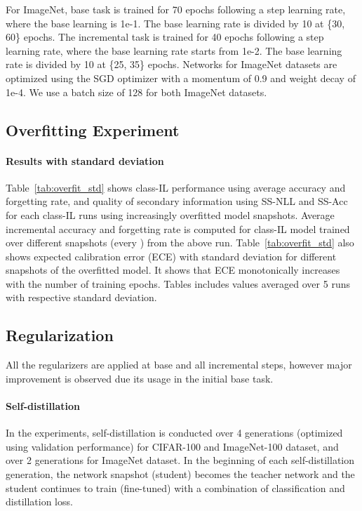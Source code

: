 \documentclass[final]{cvpr}
\begin{document}
For ImageNet, base task is trained for 70 epochs following a step learning rate, where the base learning is 1e-1. The base learning rate is divided by 10 at \{30, 60\} epochs.
The incremental task is trained for 40 epochs following a step learning rate, where the base learning rate starts from 1e-2. The base learning rate is divided by 10 at \{25, 35\} epochs. 
Networks for ImageNet datasets are optimized using the SGD optimizer with a momentum of 0.9 and weight decay of 1e-4. We use a batch size of 128 for both ImageNet datasets.











\subsection{Overfitting Experiment}

\paragraph{Results with standard deviation} Table~\ref{tab:overfit_std} shows class-IL performance using average accuracy and forgetting rate, and quality of secondary information using SS-NLL and SS-Acc for each class-IL runs using increasingly overfitted model snapshots. Average incremental accuracy and forgetting rate is computed for class-IL model trained over different snapshots (every ) from the above run. Table~\ref{tab:overfit_std} also shows expected calibration error (ECE) with standard deviation for different snapshots of the overfitted model. It shows that ECE monotonically increases with the number of training epochs.
Tables includes values averaged over 5 runs with respective standard deviation.











\subsection{Regularization}
\label{app:regularization}
All the regularizers are applied at base and all incremental steps, however major improvement is observed due its usage in the initial base task. 

\paragraph{Self-distillation}
In the experiments, self-distillation is conducted over 4 generations (optimized using validation performance) for CIFAR-100 and ImageNet-100 dataset, and over 2 generations for ImageNet dataset. In the beginning of each self-distillation generation, the network snapshot (student) becomes the teacher network and the student continues to train (fine-tuned) with a combination of classification and distillation loss. 
\end{document}
